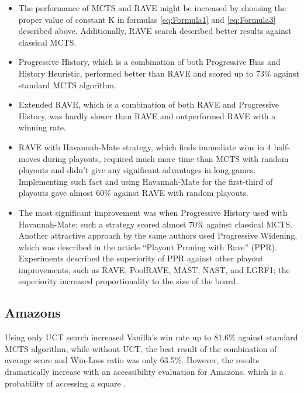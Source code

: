 \documentclass[paper=8.27in:11.69in]{scrartcl}
\begin{document}
\begin{enumerate}[label=\arabic*)]
\begin{itemize}
\item The performance of MCTS and RAVE might be increased by choosing the proper value of constant K in formulas \ref{eq:Formula1} and \ref{eq:Formula3} described above. Additionally, RAVE search described better results against classical MCTS.\\
\item Progressive History, which is a combination of both Progressive Bias and History Heuristic, performed better than RAVE and scored up to 73\% against standard MCTS algorithm.
\item Extended RAVE, which is a combination of both RAVE and Progressive History, was hardly slower than RAVE and outperformed RAVE with a winning rate.
\item RAVE with Havannah-Mate strategy, which finds immediate wins in 4 half-moves during playouts, required much more time than MCTS with random playouts and didn’t give any significant advantages in long games. Implementing such fact and using Havannah-Mate for the first-third of playouts gave almost 60\% against RAVE with random playouts.
\item The most significant improvement was when Progressive History used with Havannah-Mate; such a strategy scored almost 70\% against classical MCTS. Another attractive approach by the same authors \cite{Duguproux2016PruningPI} used Progressive Widening, which was described in the article “Playout Pruning with Rave” (PPR). Experiments described the superiority of PPR against other playout improvements, such as RAVE, PoolRAVE, MAST, NAST, and LGRF1; the superiority increased proportionality to the size of the board.
\end{itemize}

\end{enumerate}
\subsection{Amazons}
Using only UCT search increased Vanilla’s win rate up to 81.6\% against standard MCTS algorithm, while without UCT, the best result of the combination of average score and Win-Loss ratio was only 63.5\%. However, the results dramatically increase with an accessibility evaluation for Amazons, which is a probability of accessing a square \cite{Kloetzer2007TheMA}.\\
\end{document}

